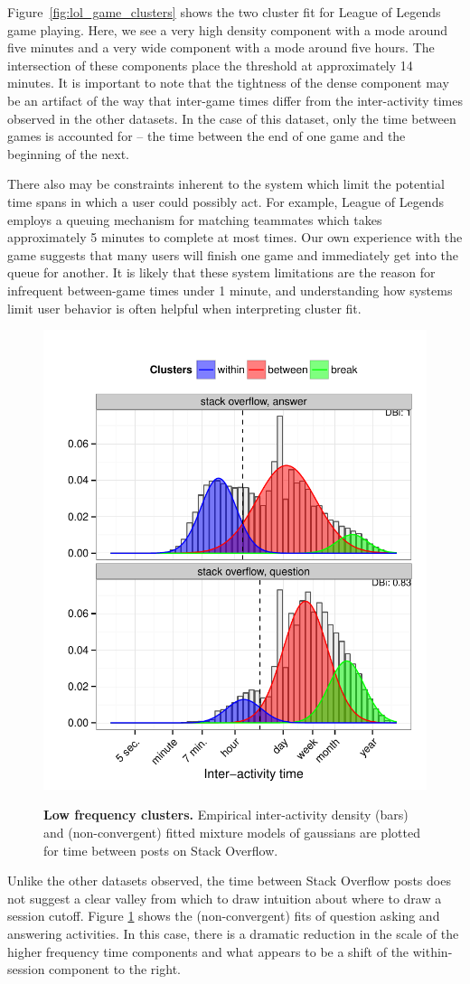 Figure~\ref{fig:lol_game_clusters} shows the two cluster fit for League of Legends game playing.  Here, we see a very high density component with a mode around five minutes and a very wide component with a mode around five hours.  The intersection of these components place the threshold at approximately 14 minutes.  It is important to note that the tightness of the dense component may be an artifact of the way that inter-game times differ from the inter-activity times observed in the other datasets.  In the case of this dataset, only the time between games is accounted for -- the time between the end of one game and the beginning of the next.

There also may be constraints inherent to the system which limit the potential time spans in which a user could possibly act.  For example, League of Legends employs a queuing mechanism for matching teammates which takes approximately 5 minutes to complete at most times.  Our own experience with the game suggests that many users will finish one game and immediately get into the queue for another.  It is likely that these system limitations are the reason for infrequent between-game times under 1 minute, and understanding how systems limit user behavior is often helpful when interpreting cluster fit.

\begin{figure}
\centering
\includegraphics[width=.45\textwidth]{figures/weird_so_clusters.pdf}
\label{fig:stack_overflow_clusters}
\caption{
    \textbf{Low frequency clusters.} Empirical inter-activity density (bars) and (non-convergent) fitted mixture models of gaussians are plotted for time between posts on Stack Overflow.
}
\end{figure}
Unlike the other datasets observed, the time between Stack Overflow posts does not suggest a clear valley from which to draw intuition about where to draw a session cutoff.  Figure \ref{fig:stack_overflow_clusters} shows the (non-convergent) fits of question asking and answering activities.  In this case, there is a dramatic reduction in the scale of the higher frequency time components and what appears to be a shift of the within-session component to the right.


